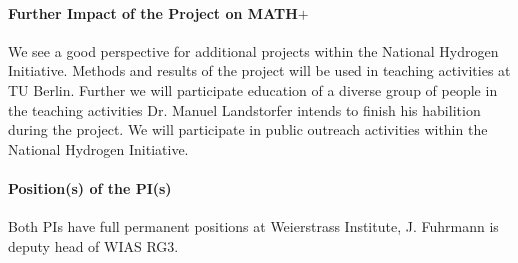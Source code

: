 \documentclass[a4paper,10pt]{article}
\begin{document}
\paragraph{Further Impact of the Project on MATH$+$}
We see a good perspective for additional projects within the National Hydrogen Initiative. 
%
Methods and results of the project will be used in teaching activities at TU Berlin.
%
Further we will participate education of a diverse group of people in the teaching activities
%
%
Dr. Manuel Landstorfer intends to finish his habilition during the project. %
%
We will participate in public outreach activities within the National Hydrogen Initiative. 

\paragraph{Position(s) of the PI(s)}
Both PIs have full permanent positions at Weierstrass Institute, J. Fuhrmann is deputy head of WIAS RG3.
\end{document}
